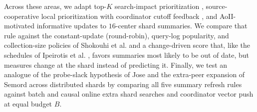 Across these areas, we adapt top-$K$ search-impact prioritization \cite{pandey2005usercentric,pandey2008crawlorder}, source-cooperative local prioritization with coordinator cutoff feedback \cite{olston2002besteffort}, and AoII-motivated informative updates \cite{maatouk2020aoii} to $16$-center shard summaries. We compare that rule against the constant-update (round-robin), query-log popularity, and collection-size policies of Shokouhi et al. \cite{shokouhi2007updating} and a change-driven score that, like the schedules of Ipeirotis et al. \cite{ipeirotis2005changes}, favors summaries most likely to be out of date, but measures change at the shard instead of predicting it. Finally, we test an analogue of the probe-slack hypothesis of Jose \cite{jose2026repartition} and the extra-peer expansion of Semord \cite{semord2026} across distributed shards by comparing all five summary refresh rules against batch and causal online extra shard searches and coordinator vector push at equal budget $B$.
